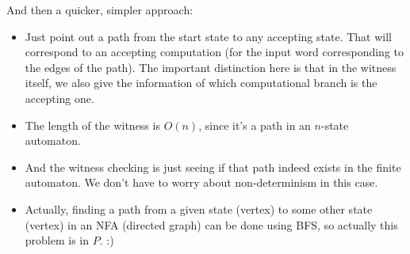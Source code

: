 And then a quicker, simpler approach:

\begin{itemize}
    \item Just point out a path from the start state to any accepting state. That will correspond to an accepting computation (for the input word corresponding to the edges of the path). The important distinction here is that in the witness itself, we also give the information of which computational branch is the accepting one.
    \item The length of the witness is $O(n)$, since it's a path in an $n$-state automaton.
    \item And the witness checking is just seeing if that path indeed exists in the finite automaton. We don't have to worry about non-determinism in this case.
    \item Actually, finding a path from a given state (vertex) to some other state (vertex) in an NFA (directed graph) can be done using BFS, so actually this problem is in $P$. :)
\end{itemize}